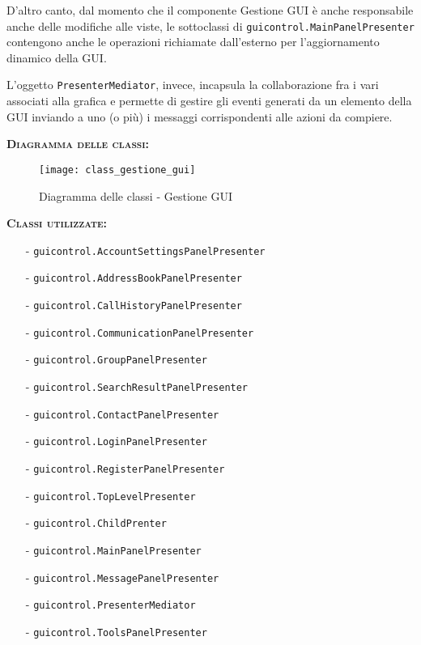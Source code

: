 \begin{description}
D'altro canto, dal momento che il componente \textsf{Gestione GUI} è anche responsabile anche delle modifiche alle viste, le sottoclassi di \texttt{guicontrol.MainPanelPresenter} contengono anche le operazioni richiamate dall'esterno per l'aggiornamento dinamico della GUI\@.

L'oggetto \texttt{PresenterMediator}, invece, incapsula la collaborazione fra i vari  associati alla grafica e permette di gestire gli eventi generati da un elemento della GUI inviando a uno (o più)  i messaggi corrispondenti alle azioni da compiere.

	\item{\scshape\bfseries Diagramma delle classi:}\\
  \begin{figure}[H]
    \centering
    \texttt{[image: class\_gestione\_gui]}
    \caption{Diagramma delle classi - Gestione GUI}\label{fig:gestionegui}
  \end{figure}

	\item{\scshape\bfseries Classi utilizzate:}\\
	\begin{itemize}[noitemsep,nolistsep]
	  \item[-] \texttt{guicontrol.AccountSettingsPanelPresenter}
	  \item[-] \texttt{guicontrol.AddressBookPanelPresenter}
	  \item[-] \texttt{guicontrol.CallHistoryPanelPresenter}
	  \item[-] \texttt{guicontrol.CommunicationPanelPresenter}
	  \item[-] \texttt{guicontrol.GroupPanelPresenter}	 
	  \item[-] \texttt{guicontrol.SearchResultPanelPresenter}	   
	  \item[-] \texttt{guicontrol.ContactPanelPresenter}
	  \item[-] \texttt{guicontrol.LoginPanelPresenter}
	  \item[-] \texttt{guicontrol.RegisterPanelPresenter}	 
	  \item[-] \texttt{guicontrol.TopLevelPresenter}	  
	  \item[-] \texttt{guicontrol.ChildPrenter}	  
	  \item[-] \texttt{guicontrol.MainPanelPresenter}
		\item[-] \texttt{guicontrol.MessagePanelPresenter}
		\item[-] \texttt{guicontrol.PresenterMediator}
	  \item[-] \texttt{guicontrol.ToolsPanelPresenter}
	\end{itemize}
\end{description}

